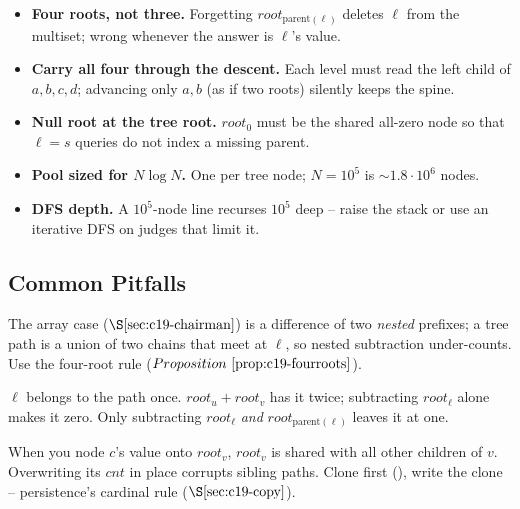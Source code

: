 \begin{hardeningbox}
\begin{itemize}[nosep,leftmargin=1.4em]
  \item \textbf{Four roots, not three.} Forgetting \(\mathit{root}_{\mathrm{parent}(\ell)}\) deletes \(\ell\) from the multiset; wrong whenever the answer is \(\ell\)'s value.
  \item \textbf{Carry all four through the descent.} Each level must read the left child of \(a,b,c,d\); advancing only \(a,b\) (as if two roots) silently keeps the spine.
  \item \textbf{Null root at the tree root.} \(\mathit{root}_0\) must be the shared all-zero node so that \(\ell=s\) queries do not index a missing parent.
  \item \textbf{Pool sized for \(N\log N\).} One  per tree node; \(N=10^5\) is \(\sim1.8\cdot10^6\) nodes.
  \item \textbf{DFS depth.} A \(10^5\)-node line recurses \(10^5\) deep -- raise the stack or use an iterative DFS on judges that limit it.
\end{itemize}
\end{hardeningbox}

\subsection{Common Pitfalls}

\begin{warningbox}
The array case (\(\secref{c19-chairman}\)) is a difference of two \emph{nested} prefixes; a tree path is a union of two chains that meet at \(\ell\), so nested subtraction under-counts. Use the four-root rule (\(\propref{c19-fourroots}\)).
\end{warningbox}

\begin{warningbox}
\(\ell\) belongs to the path once. \(\mathit{root}_u+\mathit{root}_v\) has it twice; subtracting \(\mathit{root}_\ell\) alone makes it zero. Only subtracting \(\mathit{root}_\ell\) \emph{and} \(\mathit{root}_{\mathrm{parent}(\ell)}\) leaves it at one.
\end{warningbox}

\begin{warningbox}
When you  node \(c\)'s value onto \(\mathit{root}_v\), \(\mathit{root}_v\) is shared with all other children of \(v\). Overwriting its \(\mathit{cnt}\) in place corrupts sibling paths. Clone first (), write the clone -- persistence's cardinal rule (\(\secref{c19-copy}\)).
\end{warningbox}

